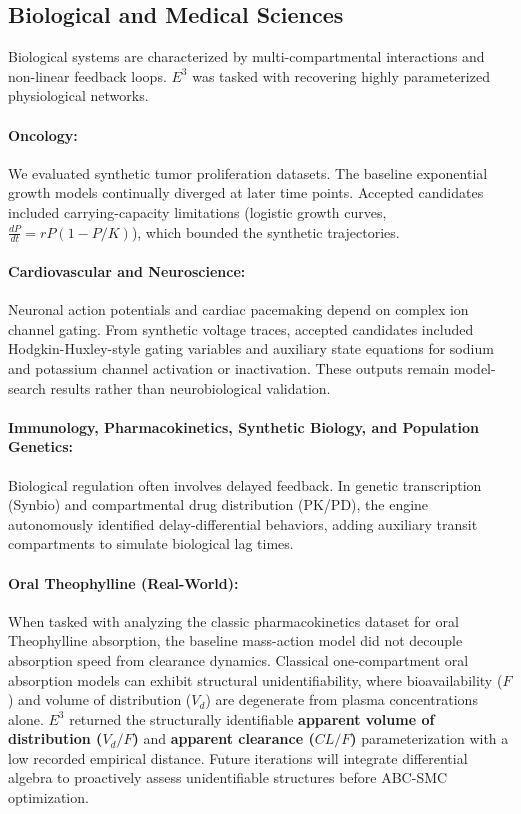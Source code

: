 \subsection{Biological and Medical Sciences}

Biological systems are characterized by multi-compartmental interactions and non-linear feedback loops. $E^3$ was tasked with recovering highly parameterized physiological networks.

\paragraph{Oncology:} We evaluated synthetic tumor proliferation datasets. The baseline exponential growth models continually diverged at later time points. Accepted candidates included carrying-capacity limitations (logistic growth curves, $\frac{dP}{dt} = rP(1 - P/K)$), which bounded the synthetic trajectories.
\paragraph{Cardiovascular and Neuroscience:} Neuronal action potentials and cardiac pacemaking depend on complex ion channel gating. From synthetic voltage traces, accepted candidates included Hodgkin-Huxley-style gating variables and auxiliary state equations for sodium and potassium channel activation or inactivation. These outputs remain model-search results rather than neurobiological validation.
\paragraph{Immunology, Pharmacokinetics, Synthetic Biology, and Population Genetics:} Biological regulation often involves delayed feedback. In genetic transcription (Synbio) and compartmental drug distribution (PK/PD), the engine autonomously identified delay-differential behaviors, adding auxiliary transit compartments to simulate biological lag times.
\paragraph{Oral Theophylline (Real-World):} When tasked with analyzing the classic pharmacokinetics dataset for oral Theophylline absorption, the baseline mass-action model did not decouple absorption speed from clearance dynamics. Classical one-compartment oral absorption models can exhibit structural unidentifiability, where bioavailability ($F$) and volume of distribution ($V_d$) are degenerate from plasma concentrations alone. $E^3$ returned the structurally identifiable \textbf{apparent volume of distribution ($V_d/F$)} and \textbf{apparent clearance ($CL/F$)} parameterization with a low recorded empirical distance. Future iterations will integrate differential algebra to proactively assess unidentifiable structures before ABC-SMC optimization.
